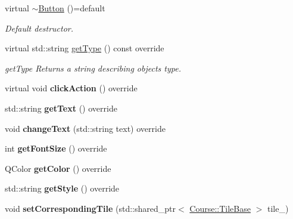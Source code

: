 \begin{DoxyCompactItemize}
\item 
\hypertarget{class_student_1_1_button_a2647be5df09126bd1c870db00b201644}{virtual \hyperlink{class_student_1_1_button_a2647be5df09126bd1c870db00b201644}{$\sim$\-Button} ()=default}\label{class_student_1_1_button_a2647be5df09126bd1c870db00b201644}

\begin{DoxyCompactList}\small\item\em Default destructor. \end{DoxyCompactList}\item 
virtual std\-::string \hyperlink{class_student_1_1_button_a2c69f5dcee1036b11154e799d6621acb}{get\-Type} () const override
\begin{DoxyCompactList}\small\item\em get\-Type Returns a string describing objects type. \end{DoxyCompactList}\item 
\hypertarget{class_student_1_1_button_a6112586b45c24bfbd8463f6748f28ac9}{virtual void {\bfseries click\-Action} () override}\label{class_student_1_1_button_a6112586b45c24bfbd8463f6748f28ac9}

\item 
\hypertarget{class_student_1_1_button_a527e02bc53cc1258e4bf8dd0fffea7ea}{std\-::string {\bfseries get\-Text} () override}\label{class_student_1_1_button_a527e02bc53cc1258e4bf8dd0fffea7ea}

\item 
\hypertarget{class_student_1_1_button_ab18659b36cc7f7df87776124bf4772c6}{void {\bfseries change\-Text} (std\-::string text) override}\label{class_student_1_1_button_ab18659b36cc7f7df87776124bf4772c6}

\item 
\hypertarget{class_student_1_1_button_a2cffbc88f362015ec782be46da92b064}{int {\bfseries get\-Font\-Size} () override}\label{class_student_1_1_button_a2cffbc88f362015ec782be46da92b064}

\item 
\hypertarget{class_student_1_1_button_ab0f900889f55263d6677f1126a96aff9}{Q\-Color {\bfseries get\-Color} () override}\label{class_student_1_1_button_ab0f900889f55263d6677f1126a96aff9}

\item 
\hypertarget{class_student_1_1_button_af24ffe18b916d185358a5bb0b2b5a90e}{std\-::string {\bfseries get\-Style} () override}\label{class_student_1_1_button_af24ffe18b916d185358a5bb0b2b5a90e}

\item 
\hypertarget{class_student_1_1_button_ac6cd60b8ee154093bd3b756c297657f3}{void {\bfseries set\-Corresponding\-Tile} (std\-::shared\-\_\-ptr$<$ \hyperlink{class_course_1_1_tile_base}{Course\-::\-Tile\-Base} $>$ tile\-\_\-)}\label{class_student_1_1_button_ac6cd60b8ee154093bd3b756c297657f3}


\end{DoxyCompactItemize}

